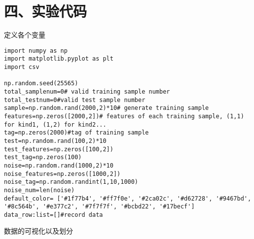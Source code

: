 \documentclass{article}
\begin{document}
\section*{\LARGE 四、实验代码}
\noindent 定义各个变量
\begin{verbatim}
import numpy as np
import matplotlib.pyplot as plt
import csv
    
np.random.seed(25565)
total_samplenum=0# valid training sample number
total_testnum=0#valid test sample number
sample=np.random.rand(2000,2)*10# generate training sample
features=np.zeros([2000,2])# features of each training sample, (1,1) for kind1, (1,2) for kind2...
tag=np.zeros(2000)#tag of training sample
test=np.random.rand(100,2)*10
test_features=np.zeros([100,2])
test_tag=np.zeros(100)
noise=np.random.rand(1000,2)*10
noise_features=np.zeros([1000,2])
noise_tag=np.random.randint(1,10,1000)
noise_num=len(noise)
default_color= ['#1f77b4', '#ff7f0e', '#2ca02c', '#d62728', '#9467bd', '#8c564b', '#e377c2', '#7f7f7f', '#bcbd22', '#17becf']
data_row:list=[]#record data
\end{verbatim}
数据的可视化以及划分
\end{document}
